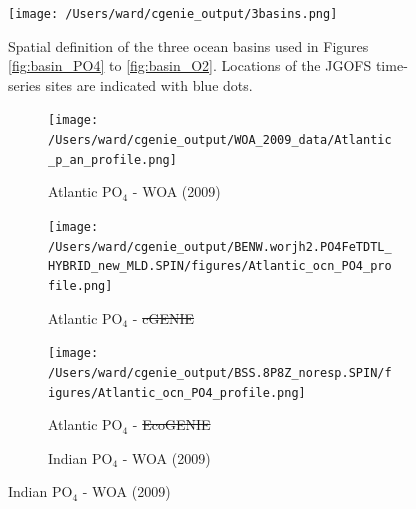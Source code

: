 \documentclass[gmd, manuscript]{copernicus}
\providecommand{\DIFadd}[1]{{\protect\color{blue}\uwave{#1}}} %
\providecommand{\DIFdel}[1]{{\protect\color{red}\sout{#1}}}                      %
\providecommand{\DIFaddFL}[1]{\DIFadd{#1}} %
\providecommand{\DIFdelFL}[1]{\DIFdel{#1}} %
\providecommand{\DIFaddbeginFL}{} %
\providecommand{\DIFaddendFL}{} %
\providecommand{\DIFdelbeginFL}{} %
\providecommand{\DIFdelendFL}{} %
\begin{document}
\begin{figure}[htp]
 \centering
 \DIFdelbeginFL %
\DIFdelendFL \DIFaddbeginFL \texttt{[image: /Users/ward/cgenie\_output/3basins.png]}
\DIFaddendFL \caption{Spatial definition of the three ocean basins used in Figures \ref{fig:basin_PO4} to \ref{fig:basin_O2}. Locations of the JGOFS time-series sites are indicated with blue dots.}
\label{fig:basins}
\end{figure}

\begin{figure}[htp]
\begin{subfigure}{.33\textwidth}
 \centering
 \caption{Atlantic PO$_4$ - WOA (2009)}
 \DIFdelbeginFL %
\DIFdelendFL \DIFaddbeginFL \texttt{[image: /Users/ward/cgenie\_output/WOA\_2009\_data/Atlantic\_p\_an\_profile.png]}
 \DIFaddendFL \label{fig:nutrients1}
\end{subfigure}%
\begin{subfigure}{.33\textwidth}
 \centering
 \caption{Atlantic PO$_4$ - \DIFdelbeginFL \DIFdelFL{cGENIE}\DIFdelendFL \DIFaddbeginFL \DIFaddFL{cGEnIE}\DIFaddendFL }
 \DIFdelbeginFL %
\DIFdelendFL \DIFaddbeginFL \texttt{[image: /Users/ward/cgenie\_output/BENW.worjh2.PO4FeTDTL\_HYBRID\_new\_MLD.SPIN/figures/Atlantic\_ocn\_PO4\_profile.png]}
 \DIFaddendFL \label{fig:nutrients1}
\end{subfigure}%
\begin{subfigure}{.33\textwidth}
 \centering
 \caption{Atlantic PO$_4$ - \DIFdelbeginFL \DIFdelFL{EcoGENIE}\DIFdelendFL \DIFaddbeginFL \DIFaddFL{EcoGEnIE}\DIFaddendFL }
 \DIFdelbeginFL %
\DIFdelendFL \DIFaddbeginFL \texttt{[image: /Users/ward/cgenie\_output/BSS.8P8Z\_noresp.SPIN/figures/Atlantic\_ocn\_PO4\_profile.png]}
 \DIFaddendFL \label{fig:nutrients2}
\end{subfigure}
\begin{subfigure}{.33\textwidth}
 \centering
 \caption{Indian PO$_4$ - WOA (2009)}
 \DIFdelbeginFL %

\end{subfigure}
\end{figure}
\end{document}
